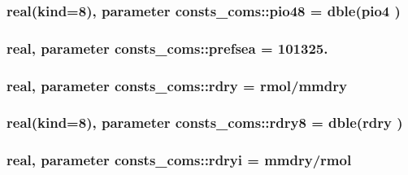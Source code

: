 \subsubsection[{\texorpdfstring{pio48}{pio48}}]{\setlength{\rightskip}{0pt plus 5cm}real(kind=8), parameter consts\+\_\+coms\+::pio48 = dble({\bf pio4} )}\hypertarget{namespaceconsts__coms_abab446622b05b70fe152b8ce68c3d2ab}{}\label{namespaceconsts__coms_abab446622b05b70fe152b8ce68c3d2ab}
\subsubsection[{\texorpdfstring{prefsea}{prefsea}}]{\setlength{\rightskip}{0pt plus 5cm}real, parameter consts\+\_\+coms\+::prefsea = 101325.}\hypertarget{namespaceconsts__coms_af9c954288aafec990d48d4e1d52a3754}{}\label{namespaceconsts__coms_af9c954288aafec990d48d4e1d52a3754}
\subsubsection[{\texorpdfstring{rdry}{rdry}}]{\setlength{\rightskip}{0pt plus 5cm}real, parameter consts\+\_\+coms\+::rdry = {\bf rmol}/{\bf mmdry}}\hypertarget{namespaceconsts__coms_a157c5f522f3f0ee63d28772673cc7584}{}\label{namespaceconsts__coms_a157c5f522f3f0ee63d28772673cc7584}
\subsubsection[{\texorpdfstring{rdry8}{rdry8}}]{\setlength{\rightskip}{0pt plus 5cm}real(kind=8), parameter consts\+\_\+coms\+::rdry8 = dble({\bf rdry} )}\hypertarget{namespaceconsts__coms_a0614a35b298bde16b9052cb91ecdae5d}{}\label{namespaceconsts__coms_a0614a35b298bde16b9052cb91ecdae5d}
\subsubsection[{\texorpdfstring{rdryi}{rdryi}}]{\setlength{\rightskip}{0pt plus 5cm}real, parameter consts\+\_\+coms\+::rdryi = {\bf mmdry}/{\bf rmol}}\hypertarget{namespaceconsts__coms_a7c5ae815359cb881b6fb6dd1e6cc6b6b}{}\label{namespaceconsts__coms_a7c5ae815359cb881b6fb6dd1e6cc6b6b}
